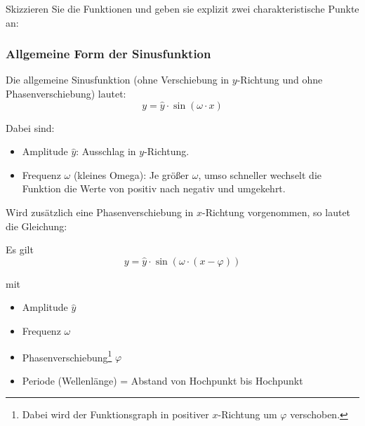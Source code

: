 {Skizzieren Sie die Funktionen und geben sie explizit zwei
charakteristische Punkte an:





\newpage



\subsubsection{Allgemeine Form der Sinusfunktion}

Die allgemeine Sinusfunktion (ohne Verschiebung in $y$-Richtung und
ohne Phasenverschiebung) lautet:
$$y=\widehat{y}\cdot{}\sin(\omega\cdot{}x)$$

Dabei sind:
\begin{itemize}

\item
  Amplitude $\widehat{y}$: Ausschlag in $y$-Richtung.
\item
  Frequenz $\omega$ (kleines Omega): Je größer $\omega$, umso schneller wechselt die
  Funktion die Werte von positiv nach negativ und umgekehrt.
\end{itemize}

Wird zusätzlich eine Phasenverschiebung in $x$-Richtung vorgenommen, so lautet die Gleichung:

\begin{gesetz}{}{}
  Es gilt
  $$y=\widehat{y}\cdot{}\sin(\omega\cdot{}(x-\varphi))$$

mit
\begin{itemize}

\item
  Amplitude $\widehat{y}$
\item
  Frequenz $\omega$
\item
  Phasenverschiebung\footnote{Dabei wird der Funktionsgraph in positiver $x$-Richtung um
    $\varphi$ verschoben.} $\varphi$
  \item Periode (Wellenlänge) = Abstand von Hochpunkt bis Hochpunkt
\end{itemize}
\end{gesetz}


}
